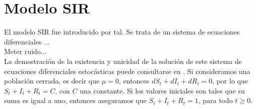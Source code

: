 \section{Modelo SIR}

El modelo SIR fue introducido por tal. Se trata de un 
sistema de ecuaciones diferenciales ...\\


Meter ruido...\\ 


La demostración de la existencia y unicidad de la solución
de este sistema de ecuaciones diferenciales estocásticas 
puede consultarse en \cite{aliStochasticModelingInfluenza2024}. 
Si consideramos una población cerrada, es decir que $\mu = 0$,
entonces $dS_t + dI_t + dR_t = 0$, por lo que $S_t+I_t+R_t = C$, con 
$C$ una constante. Si los valores iniciales son tales que su suma 
es igual a uno, entonces aseguramos que $S_t+I_t+R_t=1$, para todo 
$t\geq 0$.
